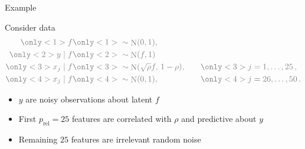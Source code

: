 \documentclass[english,t]{beamer}
\DeclareMathOperator{\N}{N}
\begin{document}
\begin{frame}{}

  {\Large\color{navyblue} Example}

Consider data
\begin{equation*}
  \color{gray}
\begin{alignedat}{2}
  \only<1>{\color{black}}f & \only<1>{\color{black}} \sim \N(0,1), &&  \\
  \only<2>{\color{black}}y \mid f &\only<2>{\color{black}}\sim \N(f, 1) && \\
  \only<3>{\color{black}}x_j \mid f &\only<3>{\color{black}}\sim \N(\sqrt{\rho}f,\, 1-\rho), \qquad &&\only<3>{\color{black}} j = 1,\dots,25 \,, \\
  \only<4>{\color{black}}x_j \mid f &\only<4>{\color{black}}\sim \N(0, 1), && \only<4>{\color{black}}j = 26,\dots, 50 \,.
\end{alignedat}
\end{equation*}

\begin{itemize}
\item<2-> $y$ are noisy observations about latent $f$ \pause
\item<3-> First $p_\text{rel}=25$ features are correlated with $\rho$ and predictive about $y$ \pause
\item<4-> Remaining $25$ features are irrelevant random noise
\end{itemize}

\end{frame}
\end{document}
